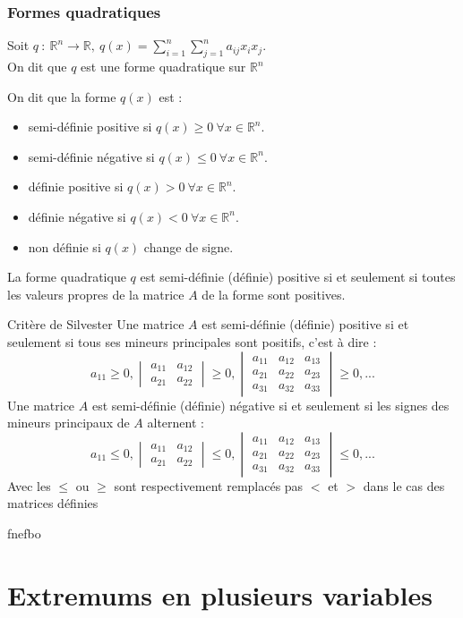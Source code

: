 \subsection{Formes quadratiques}
\begin{defi}
Soit $q\ :\ \mathbb{R}^n\to\mathbb{R},\ q(x)=\sum_{i=1}^n\sum_{j=1}^n a_{ij}x_i x_j$.\\
On dit que $q$ est une forme quadratique sur $\mathbb{R}^n$
\end{defi}
\begin{defi}
On dit que la forme $q(x)$ est :
\begin{itemize}
    \item semi-définie positive si $q(x)\ge 0\ \forall x\in\mathbb{R}^n$.
    \item semi-définie négative si $q(x)\leq 0\ \forall x\in\mathbb{R}^n$.
    \item définie positive si $q(x)> 0\ \forall x\in\mathbb{R}^n$.
    \item définie négative si $q(x)< 0\ \forall x\in\mathbb{R}^n$.
    \item non définie si $q(x)$ change de signe.
\end{itemize}
\end{defi}
\begin{thm}[Proposition]
La forme quadratique $q$ est semi-définie (définie) positive si et seulement si toutes les valeurs propres de la matrice $A$ de la forme sont positives.
\end{thm}
\begin{bclogo}[couleur=green!30,couleurBord=green,logo=\bccle ,ombre=true,arrondi=0.1]{Critère de Silvester}
Une matrice $A$ est semi-définie (définie) positive si et seulement si tous ses mineurs principales sont positifs, c'est à  dire :
$$a_{11}\ge 0, \begin{vmatrix} a_{11}&a_{12}\\ a_{21} & a_{22}\end{vmatrix}\ge 0,\begin{vmatrix}a_{11} & a_{12} & a_{13}\\ a_{21} & a_{22} & a_{23}\\ a_{31} & a_{32} & a_{33}\end{vmatrix}\ge 0, ...$$
Une matrice $A$ est semi-définie (définie) négative si et seulement si les signes des mineurs principaux de $A$ alternent :
$$a_{11}\leq 0, \begin{vmatrix} a_{11}&a_{12}\\ a_{21} & a_{22}\end{vmatrix}\leq 0,\begin{vmatrix}a_{11} & a_{12} & a_{13}\\ a_{21} & a_{22} & a_{23}\\ a_{31} & a_{32} & a_{33}\end{vmatrix}\leq 0, ...$$
Avec les $\leq$ ou $\ge$ sont respectivement remplacés pas $<$ et $>$ dans le cas des matrices définies
\end{bclogo}
\begin{ex}
fnefbo
\end{ex}
\chapter{Extremums en plusieurs variables}